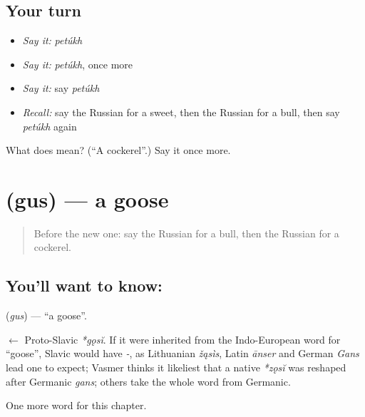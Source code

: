\subsection*{Your turn}
\begin{itemize}
\raggedright
  \item \emph{Say it:} \emph{petúkh}
  \item \emph{Say it:} \emph{petúkh}, once more
  \item \emph{Say it:} say \emph{petúkh}
  \item \emph{Recall:} say the Russian for a sweet, then the Russian for a bull, then say \emph{petúkh} again
\end{itemize}

\begin{tcolorbox}[breakable,colback=teal!4,colframe=teal!35!black,title={Before you move on}]
What does  mean? (\textquotedblleft{}A cockerel\textquotedblright{}.) Say it once more.
\end{tcolorbox}
\section[\texorpdfstring{\ru{гусь} (gus)}{гусь (gus)}]{ (gus) — a goose}

\label{lesson:RU-C251-gus}



\begin{quote}
Before the new one: say the Russian for a bull, then the Russian for a cockerel.
\end{quote}

\subsection*{You'll want to know: }
\textbf{} (\emph{gus}) — \textquotedblleft{}a goose\textquotedblright{}.

\begin{cousinweb}
\textbf{} $\leftarrow$ Proto-Slavic \emph{*gǫsĭ}. If it were inherited from the Indo-European word for \textquotedblleft{}goose\textquotedblright{}, Slavic would have \emph{-}, as Lithuanian \emph{žąsìs}, Latin \emph{ānser} and German \emph{Gans} lead one to expect; Vasmer thinks it likeliest that a native \emph{*zǫsĭ} was reshaped after Germanic \emph{gans}; others take the whole word from Germanic.
\end{cousinweb}

\begin{grammarlens}[title={What you've built}]
One more word for this chapter.
\end{grammarlens}

